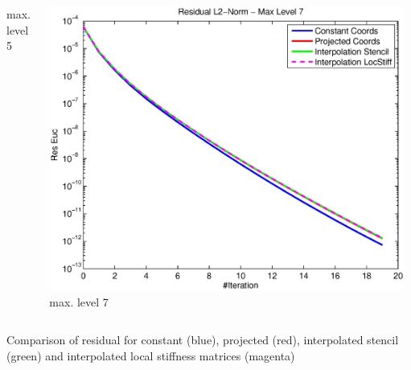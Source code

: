 \documentclass[t,compress=false,usepdftitle=false]{beamer}
\begin{document}
\begin{frame}
\begin{columns}[T]
\begin{column}[T]{4.3cm}
  max. level 5
\end{column}\hfill
\begin{column}[T]{4.3cm} 
  \centering
  \includegraphics[width=0.98\textwidth]{spherepoisson_resEuc_level7}\\
  max. level 7
\end{column}
\end{columns}
\vspace{0.5cm}
\centering
Comparison of residual for constant (blue), projected (red), interpolated
stencil (green) and interpolated local stiffness matrices (magenta)
\end{frame}
%
%
%
\end{document}
